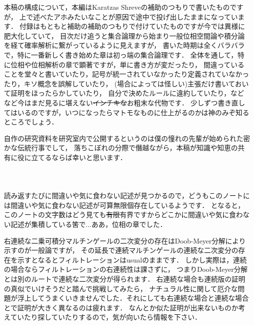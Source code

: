 本稿の構成について，本編はKaratzas Shreveの補助のつもりで書いたものですが，
上で述べたアホみたいなことが原因で途中で投げ出したままになっています．
付録はもともと補助の補助のつもりで付けていたものですが今では異様に肥大化していて，
目次だけ追うと集合論理から始まり一般位相空間論や積分論を経て確率解析に繋がっているように見えますが，
書いた時期は全くバラバラで，特に一番新しく書き始めた章は初っ端の集合論理です．
全体を通して，特に位相や位相解析の章で顕著ですが，単に書き方が変だったり，
間違っていることを堂々と書いていたり，記号が統一されていなかったり定義されていなかったり，キソ概念を誤解していたり，
(場合によっては怪しい)主張だけ書いておいて証明をほったらかしていたり，
自分で決めたルールに違約していたり，などなど今はまだ見るに堪えない\sout{インチキな}お粗末な代物です．
少しずつ書き直してはいるのですが，いつになったらマトモなものに仕上がるのかは神のみぞ知るところでしょう．

自作の研究資料を研究室内で公開するというのは僕の憧れの先輩が始められた密かな伝統行事でして，
落ちこぼれの分際で僭越ながら，本稿が知識や知恵の共有に役に立てるならば幸いと思います．
\\
\\
\\
\\
読み返すたびに間違いや気に食わない記述が見つかるので，どうもこのノートには間違いや気に食わない記述が可算無限個存在しているようです．
となると，このノートの文字数はどう見ても\sout{有限}有界ですからどこかに間違いや気に食わない記述が集積している筈で...ああ，位相の章でした．

右連続な二乗可積分マルチンゲールの二次変分の存在はDoob-Meyer分解により示すのが一般論ですが，
その延長で連続マルチンゲールの連続な二次変分の存在を示すとなるとフィルトレーションはusualのままです．
しかし実際は，連続の場合ならフィルトレーションの右連続性は課さずに，
つまりDoob-Meyer分解とは別のルートで連続な二次変分が得られます．
右連続な場合も連続版の証明の真似でいけそうだと踏んで挑戦してみたら，
ナチュラル性に関して厄介な問題が浮上してうまくいきませんでした．それにしても右連続な場合と連続な場合とで証明が大きく異なるのは疲れます．
なんとか似た証明が出来ないものか考えていたり探していたりするので，気が向いたら情報を下さい．
\\
\\
